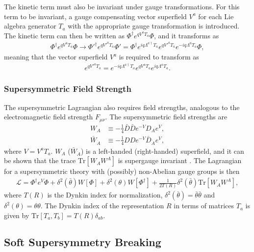 \documentclass[twoside,english]{uiofysmaster}
\begin{document}
The kinetic term must also be invariant under gauge transformations. For this term to be invariant, a gauge compensating vector superfield $V^a$ for each Lie algebra generator $T_a$ with the appropriate gauge transformation is introduced. The kinetic term can then be written as $\Phi^{\dagger} e^{qV^aT_a} \Phi$, and it transforms as
\begin{align}
\Phi^{\dagger} e^{qV^aT_a} \Phi \rightarrow {\Phi'}^{\dagger} e^{q{V'}^aT_a} \Phi' = \Phi^{\dagger} e^{iq\Lambda^{a \dagger} T_a} e^{q{V'}^aT_a} e^{-iq \Lambda^a T_a} \Phi,
\end{align}
meaning that the vector superfield $V^a$ is required to transform as
\begin{align}
e^{q{V'}^a T_a} = e^{-iq \Lambda^{a \dagger} T_a} e^{qV^aT_a} e^{iq\Lambda^a T_a}.
\end{align}

\subsubsection{Supersymmetric Field Strength}

The supersymmetric Lagrangian also requires field strengths, analogous to the electromagnetic field strength $F_{\mu \nu}$. The supersymmetric field strengths are 
\begin{align}
W_A & \equiv - \frac{1}{4} \bar{D} \bar{D} e^{-V} D_A e^V,\\
\bar{W}_{\dot{A}} & \equiv - \frac{1}{4} DDe^{-V}\bar{D}_{\dot{A}} e^V,
\end{align}
where $V = V^a T_a$. $W_A$ ($\bar{W}_{\dot{A}}$) is a left-handed (right-handed) superfield, and it can be shown that the trace $\text{Tr}[W_AW^A]$ is supergauge invariant \cite{batzing2017lecture}. The Lagrangian for a supersymmetric theory with (possibly) non-Abelian gauge groups is then
\begin{align}
\mathcal{L} = \Phi^{\dagger} e^{V} \Phi + \delta^2 (\bar{\theta}) W[\Phi] + \delta^2 (\theta) W[\Phi^{\dagger}] + \frac{1}{2T(R)} \delta^2 (\bar{\theta}) \text{Tr}[W_AW^A],
\end{align}
where $T(R)$ is the Dynkin index for normalization, $\delta^2(\bar{\theta}) = \bar{\theta} \bar{\theta}$ and $\delta^2(\theta) = \theta \theta$. The Dynkin index of the representation $R$ in terms of matrices $T_a$ is given by $\text{Tr}[T_a, T_b] = T(R) \delta_{ab}$.

\subsection{Soft Supersymmetry Breaking}\label{Sec:: phys back : Soft Supersymmetry Breaking}
\end{document}

